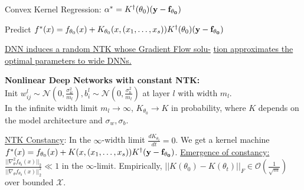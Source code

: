 Convex Kernel Regression: $\alpha^* = K^\dagger (\theta_0) (\bf y - \bf f_{\theta_0})$

Predict $f^*(x) = f_{\theta_0}(x) + K_{\theta_0}(x, (x_1, \ldots, x_s)) K^\dagger(\theta_0) (\bf y - \bf f_{\theta_0})$

\underline{DNN induces a random NTK whose Gradient Flow solu-}
\underline{tion approximates the optimal parameters to wide DNNs.}

\textbf{Nonlinear Deep Networks with constant NTK:}\\
Init $w_{ij}^l \sim \mathcal{N}(0,  \frac{\sigma_w^2}{m_l}), b_i^l \sim \mathcal{N}(0, \frac{\sigma_b^2}{m_l})$ at layer \(l\) with width \(m_l\).\\
In the infinite width limit \(m_l \to \infty\), $K_{\theta_0} \to K$ in probability, where $K$ depends on the model architecture and \(\sigma_w, \sigma_b\).

\underline{NTK Constancy}: In the $\infty$-width limit $\frac{d K_{\theta_t}}{dt} = 0$. We get a kernel machine 
$f^*(x) = f_{\theta_0}(x) + K(x, (x_1, \ldots, x_s)) K^\dagger (\bf y - \bf f_{\theta_0})$.
\underline{Emergence of constancy:} $\frac{||\nabla^2_\theta f_{\theta_0}(x)||_2}{||\nabla_\theta f_{\theta_0}(x)||_2^2 } \ll 1$ in the $\infty$-limit. Empirically, $||K(\theta_0) - K(\theta_t)||_F \in \mathcal{O}(\frac{1}{\sqrt{m}})$ over bounded \(\mathcal X\).